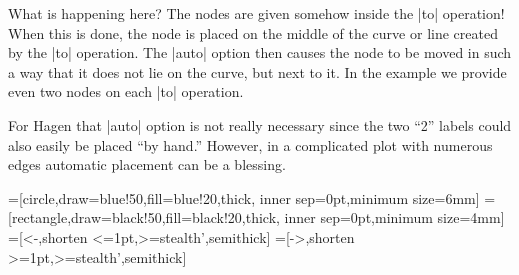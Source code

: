 {
\begin{codeexample}[]
\end{codeexample}
}

What is happening here? The nodes are given somehow inside the |to|
operation! When this is done, the node is placed on the middle of the
curve or line created by the |to| operation. The |auto| option then
causes the node to be moved in such a way that it does not lie on the
curve, but next to it. In the example we provide even two nodes on
each |to| operation.

For Hagen that |auto| option is not really necessary since the two
``2'' labels could also easily be placed ``by hand.'' However, in a
complicated plot with numerous edges automatic placement can be a
blessing. 

{
=[circle,draw=blue!50,fill=blue!20,thick,
                   inner sep=0pt,minimum size=6mm]
=[rectangle,draw=black!50,fill=black!20,thick,
                        inner sep=0pt,minimum size=4mm]
=[<-,shorten <=1pt,>=stealth',semithick]  
=[->,shorten >=1pt,>=stealth',semithick]  
\begin{codeexample}[]
\end{codeexample}
}



